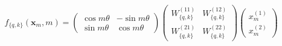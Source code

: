 \begin{equation}
    f_{\{q,k\}}(\mathbf{x}_m, m) = 
    \begin{pmatrix} 
    \cos m\theta & -\sin m \theta  \\
    \sin m\theta & \cos m\theta 
    \end{pmatrix}
    \begin{pmatrix} 
    W_{\{q,k\}}^{(11)} & W_{\{q,k\}}^{(12)}  \\ W_{\{q,k\}}^{(21)} & W_{\{q,k\}}^{(22)} 
    \end{pmatrix} 
    \begin{pmatrix} 
    x_m^{(1)}\\
    x_m^{(2)}
    \end{pmatrix} 
\end{equation}